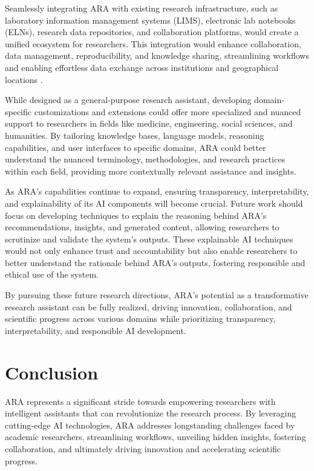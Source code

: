 \documentclass[a4paper,conference]{IEEEtran}
\begin{document}
Seamlessly integrating ARA with existing research infrastructure, such as laboratory information management systems (LIMS), electronic lab notebooks (ELNs), research data repositories, and collaboration platforms, would create a unified ecosystem for researchers. This integration would enhance collaboration, data management, reproducibility, and knowledge sharing, streamlining workflows and enabling effortless data exchange across institutions and geographical locations \cite{researchinfra}.

While designed as a general-purpose research assistant, developing domain-specific customizations and extensions could offer more specialized and nuanced support to researchers in fields like medicine, engineering, social sciences, and humanities. By tailoring knowledge bases, language models, reasoning capabilities, and user interfaces to specific domains, ARA could better understand the nuanced terminology, methodologies, and research practices within each field, providing more contextually relevant assistance and insights.

As ARA's capabilities continue to expand, ensuring transparency, interpretability, and explainability of its AI components will become crucial. Future work should focus on developing techniques to explain the reasoning behind ARA's recommendations, insights, and generated content, allowing researchers to scrutinize and validate the system's outputs. These explainable AI techniques would not only enhance trust and accountability but also enable researchers to better understand the rationale behind ARA's outputs, fostering responsible and ethical use of the system.

By pursuing these future research directions, ARA's potential as a transformative research assistant can be fully realized, driving innovation, collaboration, and scientific progress across various domains while prioritizing transparency, interpretability, and responsible AI development.


\section{Conclusion}
ARA represents a significant stride towards empowering researchers with intelligent assistants that can revolutionize the research process. By leveraging cutting-edge AI technologies, ARA addresses longstanding challenges faced by academic researchers, streamlining workflows, unveiling hidden insights, fostering collaboration, and ultimately driving innovation and accelerating scientific progress.
\end{document}

